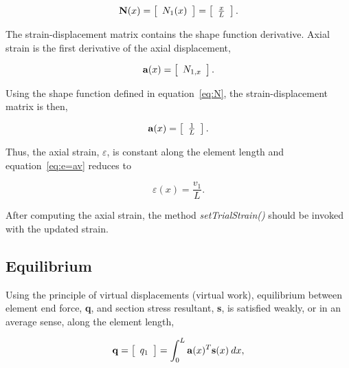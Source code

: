 \documentclass[12pt]{article}
\begin{document}
\begin{equation}
\label{eq:N}
{\bf N}(x) =
\left[ \begin{array}{c} N_1(x) \end{array} \right] =
\left[ \begin{array}{c} \frac{x}{L} \end{array}
\right].
\end{equation}

\noindent The strain-displacement matrix contains the shape function derivative.
Axial strain is the first derivative of the axial displacement,

\begin{equation}
{\bf a}(x) = \left[ \begin{array}{c}
N_{1,x} \end{array}
\right].
\end{equation}

\noindent Using the shape function defined in equation~\ref{eq:N}, the
strain-displacement matrix is then,

\begin{equation}
{\bf a}(x) = \left[ \begin{array}{c} \frac{1}{L}
\end{array}
\right].
\end{equation}

\noindent Thus, the axial strain, $\varepsilon$, is constant along the element
length and equation~\ref{eq:e=av} reduces to

\begin{equation}
\varepsilon(x) = \frac{v_1}{L}.
\end{equation}

After computing the axial strain, the method {\em setTrialStrain()} should be invoked
with the updated strain.

\subsection{Equilibrium}
Using the principle of virtual displacements (virtual work),
equilibrium between element end force, {\bf q}, and section stress
resultant, {\bf s},
is satisfied weakly, or in an average sense, along the element length,

\begin{equation}
\label{eq:q}
{\bf q} =  \left[ \begin{array}{c} q_1 \end{array} \right] =
\int_0^L {\bf a}(x)^T {\bf s}(x) \: dx,
\end{equation}
\end{document}
